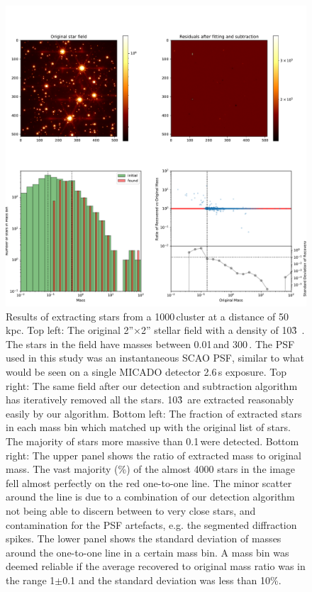 \begin{appendix}
\begin{figure}
    \centering
    \includegraphics[width=\textwidth]{images/tbl_stats_dist=50000_rho=1000.pdf}
    \caption{Results of extracting stars from a 1000\,\spa cluster at a distance of 50\,kpc. Top left: The original 2''$\times$2'' stellar field with a density of 10\h3~\spa. The stars in the field have masses between 0.01\,\msun and 300\,\msune. The PSF used in this study was an instantaneous SCAO PSF, similar to what would be seen on a single MICADO detector 2.6\,s exposure. Top right: The same field after our detection and subtraction algorithm has iteratively removed all the stars. 10\h3~\spa are extracted reasonably easily by our algorithm. Bottom left: The fraction of extracted stars in each mass bin which matched up with the original list of stars. The majority of stars more massive than 0.1\,\msun were detected. Bottom right: The upper panel shows the ratio of extracted mass to original mass. The vast majority (\%) of the almost 4000 stars in the image fell almost perfectly on the red one-to-one line. The minor scatter around the line is due to a combination of our detection algorithm not being able to discern between to very close stars, and contamination for the PSF artefacts, e.g. the segmented diffraction spikes. The lower panel shows the standard deviation of masses around the one-to-one line in a certain mass bin. A mass bin was deemed reliable if the average recovered to original mass ratio was in the range 1$\pm$0.1 and the standard deviation was less than 10\%.}
    \label{fig:results_lmc_1E3}
\end{figure}



\end{appendix}
